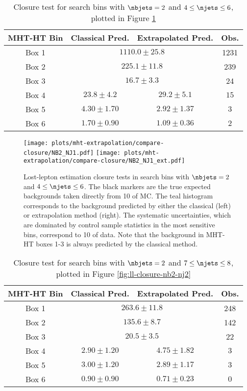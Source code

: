 \begin{table}[h]\centering
  \caption{Closure test for search bins with $\nbjets=2$ and $4\leq\njets\leq6$, plotted in Figure \ref{fig:ll-closure-nb2-nj1}}
  \begin{tabular}{|c|c|c|c|}
    \hline
    MHT-HT Bin & Classical Pred. & Extrapolated Pred. & Obs.  \\ \hline
Box 1 & \multicolumn{2}{c|}{$1110.0\pm25.8$} & 1231 \\
Box 2 & \multicolumn{2}{c|}{$225.1\pm11.8$} & 239 \\
Box 3 & \multicolumn{2}{c|}{$16.7\pm3.3$} &  24 \\
\hline
Box 4 & $23.8\pm4.2$ & $29.2\pm5.1$ & $ 15$ \\
Box 5 & $4.30\pm1.70$ & $2.92\pm1.37$ & $  3$ \\
Box 6 & $1.70\pm0.90$ & $1.09\pm0.36$ & $  2$ \\
    \hline  \end{tabular}
    \label{tab:ll-closure-nb2-nj1}
\end{table}

\begin{figure}
  \begin{center}
    \texttt{[image: plots/mht-extrapolation/compare-closure/NB2\_NJ1.pdf]} 
    \texttt{[image: plots/mht-extrapolation/compare-closure/NB2\_NJ1\_ext.pdf]}
  \caption{
      Lost-lepton estimation closure tests in search bins with $\nbjets=2$ and $4\leq\njets\leq6$.  The black markers are the true expected backgrounds taken directly from 10 \fbinv of \ttbar MC.  The teal histogram corresponds to the background predicted by either the classical (left) or extrapolation method (right).  The systematic uncertainties, which are dominated by control sample statistics in the most sensitive bins, correspond to 10 \invfb of data.  Note that the background in MHT-HT boxes 1-3 is always predicted by the classical method.
    }
    \label{fig:ll-closure-nb2-nj1}
  \end{center}
\end{figure}
\clearpage


\begin{table}[h]\centering
  \caption{Closure test for search bins with $\nbjets=2$ and $7\leq\njets\leq8$, plotted in Figure \ref{fig:ll-closure-nb2-nj2}}
  \begin{tabular}{|c|c|c|c|}
    \hline
    MHT-HT Bin & Classical Pred. & Extrapolated Pred. & Obs.  \\ \hline
Box 1 & \multicolumn{2}{c|}{$263.6\pm11.8$} & 248 \\
Box 2 & \multicolumn{2}{c|}{$135.6\pm8.7$} & 142 \\
Box 3 & \multicolumn{2}{c|}{$20.5\pm3.5$} &  22 \\
\hline
Box 4 & $2.90\pm1.20$ & $4.75\pm1.82$ & $  3$  \\
Box 5 & $3.00\pm1.20$ & $2.89\pm1.17$ & $  3$ \\
Box 6 & $0.90\pm0.90$ & $0.71\pm0.23$ & $  0$ \\
    \hline  \end{tabular}
    \label{tab:ll-closure-nb2-nj2}
\end{table}


